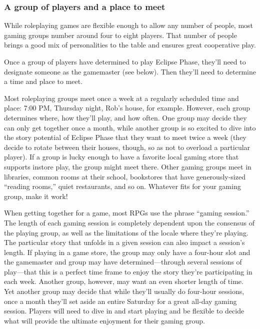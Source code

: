 \subsubsection{A group of players and a place to meet} \label{sec:group-players} 

While roleplaying games are flexible enough to allow any number of people, most gaming groups number around four to eight players. That number of people brings a good mix of personalities to the table and ensures great cooperative play. 

Once a group of players have determined to play Eclipse Phase, they'll need to designate someone as the gamemaster (see below). Then they'll need to determine a time and place to meet. 

Most roleplaying groups meet once a week at a regularly scheduled time and place: 7:00 PM, Thursday night, Rob's house, for example. However, each group determines where, how they'll play, and how often. One group may decide they can only get together once a month, while another group is so excited to dive into the story potential of Eclipse Phase that they want to meet twice a week (they decide to rotate between their houses, though, so as not to overload a particular player). If a group is lucky enough to have a favorite local gaming store that supports instore play, the group might meet there. Other gaming groups meet in libraries, common rooms at their school, bookstores that have generously-sized ``reading rooms,'' quiet restaurants, and so on. Whatever fits for your gaming group, make it work! 

When getting together for a game, most RPGs use the phrase ``gaming session.'' The length of each gaming session is completely dependent upon the consensus of the playing group, as well as the limitations of the locale where they're playing. The particular story that unfolds in a given session can also impact a session's length. If playing in a game store, the group may only have a four-hour slot and the gamemaster and group may have determined—through several sessions of play—that this is a perfect time frame to enjoy the story they're participating in each week. Another group, however, may want an even shorter length of time. Yet another group may decide that while they'll usually do four-hour sessions, once a month they'll set aside an entire Saturday for a great all-day gaming session. Players will need to dive in and start playing and be flexible to decide what will provide the ultimate enjoyment for their gaming group. 

